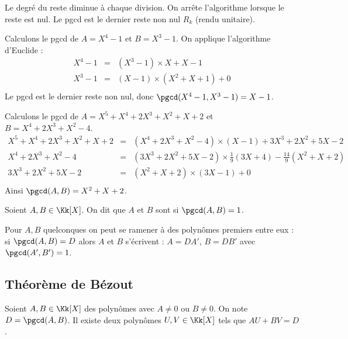 \documentclass[class=report,crop=false]{standalone}
\begin{document}
Le degré du reste diminue à chaque division.
On arrête l'algorithme lorsque le reste est nul.
Le pgcd est le dernier reste non nul $R_k$ (rendu unitaire).


\begin{exemple}
Calculons le pgcd de  $A=X^4-1$ et $B=X^3-1$.
On applique l'algorithme d'Euclide :
$$\begin{array}{rcl}
X^4-1 & = & (X^3-1) \times X + X-1 \\
X^3-1 & = & (X-1)\times (X^2+X+1) + 0 \\
\end{array}$$
Le pgcd est le dernier reste non nul, donc $\pgcd(X^4-1, X^3-1)=X-1$.
\end{exemple}


\begin{exemple}
Calculons le pgcd de  $A=X^5+X^4+2X^3+X^2+X+2$ et $B=X^4+2X^3+X^2-4$.
{\small
$$\begin{array}{rcl}
X^5+X^4+2X^3+X^2+X+2 & = & (X^4+2X^3+X^2-4) \times (X-1)  + 3X^3+2X^2+5X-2\\
X^4+2X^3+X^2-4 & = & (3X^3+2X^2+5X-2)\times \frac19(3X+4) - \frac{14}{9}(X^2+X+2) \\
3X^3+2X^2+5X-2 & = & (X^2+X+2) \times (3X-1) + 0 \\
\end{array}$$
}
Ainsi $\pgcd(A,B)=X^2+X+2$.
\end{exemple}




\begin{definition}
Soient  $A,B \in\Kk[X]$. On dit que $A$ et $ B$ sont  si  $\pgcd(A,B)=1$.
\end{definition}

Pour $A,B$ quelconques on peut se ramener à des polynômes premiers entre eux :
si  $\pgcd(A,B)=D$ alors $A$ et $B$ s'écrivent : $A=DA'$, $B=DB'$ avec $\pgcd(A',B')=1$.



\subsection{Théorème de Bézout}

\begin{theoreme}
\label{thm_Bezout}
Soient $A, B\in \Kk[X]$ des polynômes avec $A\neq 0$ ou $B\neq 0$.
On note $D=\pgcd(A,B)$.
Il existe deux polynômes $U, V\in \Kk[X]$ tels que $AU+BV=D$.
\end{theoreme}
\end{document}

